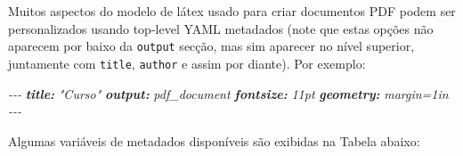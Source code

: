 \documentclass[
]{book}
\newenvironment{Shaded}{\begin{snugshade}}{\end{snugshade}}
\newcommand{\AnnotationTok}[1]{\textcolor[rgb]{0.56,0.35,0.01}{\textbf{\textit{#1}}}}
\newcommand{\CommentTok}[1]{\textcolor[rgb]{0.56,0.35,0.01}{\textit{#1}}}
\begin{document}
Muitos aspectos do modelo de látex usado para criar documentos PDF podem ser personalizados usando top-level YAML metadados (note que estas opções não aparecem por baixo da \texttt{output} secção, mas sim aparecer no nível superior, juntamente com \texttt{title}, \texttt{author} e assim por diante). Por exemplo:

\begin{Shaded}
\begin{Highlighting}[]
\CommentTok{{-}{-}{-}}
\AnnotationTok{title:}\CommentTok{ "Curso"}
\AnnotationTok{output:}\CommentTok{ pdf\_document}
\AnnotationTok{fontsize:}\CommentTok{ 11pt}
\AnnotationTok{geometry:}\CommentTok{ margin=1in}
\CommentTok{{-}{-}{-}}
\end{Highlighting}
\end{Shaded}

Algumas variáveis de metadados disponíveis são exibidas na Tabela abaixo:
\end{document}

